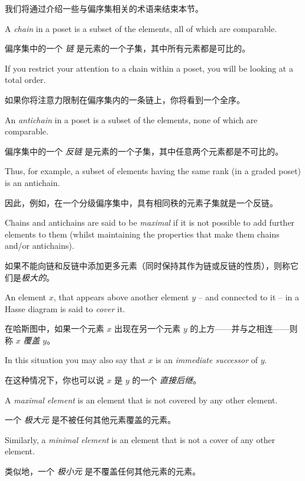 我们将通过介绍一些与偏序集相关的术语来结束本节。

A \emph{chain} in a poset is a subset of the elements, all 
of which are comparable.

偏序集中的一个 \emph{链} 是元素的一个子集，其中所有元素都是可比的。

If you restrict your attention to a chain within 
a poset, you will be looking at a total order.

如果你将注意力限制在偏序集内的一条链上，你将看到一个全序。

An \emph{antichain} in a poset is a subset
of the elements, none of which are comparable.

偏序集中的一个 \emph{反链} 是元素的一个子集，其中任意两个元素都是不可比的。

Thus, for example, a subset
of elements having the same rank (in a graded poset) is an antichain.

因此，例如，在一个分级偏序集中，具有相同秩的元素子集就是一个反链。

Chains and antichains are said to be \emph{maximal} if it
is not possible to add further elements to them (whilst maintaining the 
properties that make them chains and/or antichains).

如果不能向链和反链中添加更多元素（同时保持其作为链或反链的性质），则称它们是\emph{极大的}。

An element $x$, that 
appears above another element $y$ -- and connected to it -- in a Hasse
diagram is said to \emph{cover} it.

在哈斯图中，如果一个元素 $x$ 出现在另一个元素 $y$ 的上方——并与之相连——则称 $x$ \emph{覆盖} $y$。

In this situation
you may also say that $x$ is an \emph{immediate successor} of
$y$.

在这种情况下，你也可以说 $x$ 是 $y$ 的一个 \emph{直接后继}。

A \emph{maximal element} is an element that is not covered by any other element.

一个 \emph{极大元} 是不被任何其他元素覆盖的元素。

Similarly, a 
\emph{minimal element} is an element that is not a cover of any other element.

类似地，一个 \emph{极小元} 是不覆盖任何其他元素的元素。

